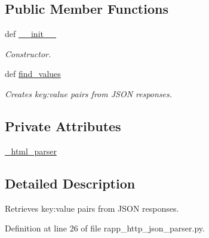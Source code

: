 \subsection*{Public Member Functions}
\begin{DoxyCompactItemize}
\item 
def \hyperlink{classsrc_1_1rapp__http__json__parser_1_1RappHttpJSONParser_a34986f143bae583889532c338910650d}{\-\_\-\-\_\-init\-\_\-\-\_\-}
\begin{DoxyCompactList}\small\item\em Constructor. \end{DoxyCompactList}\item 
def \hyperlink{classsrc_1_1rapp__http__json__parser_1_1RappHttpJSONParser_ae74e21b2769a5b835d90ef389d21c6a0}{find\-\_\-values}
\begin{DoxyCompactList}\small\item\em Creates key\-:value pairs from J\-S\-O\-N responses. \end{DoxyCompactList}\end{DoxyCompactItemize}
\subsection*{Private Attributes}
\begin{DoxyCompactItemize}
\item 
\hyperlink{classsrc_1_1rapp__http__json__parser_1_1RappHttpJSONParser_a7d5fd55ad946ad4e9fedc331b27a0f9f}{\-\_\-html\-\_\-parser}
\end{DoxyCompactItemize}


\subsection{Detailed Description}
Retrieves key\-:value pairs from J\-S\-O\-N responses. 

Definition at line 26 of file rapp\-\_\-http\-\_\-json\-\_\-parser.\-py.



